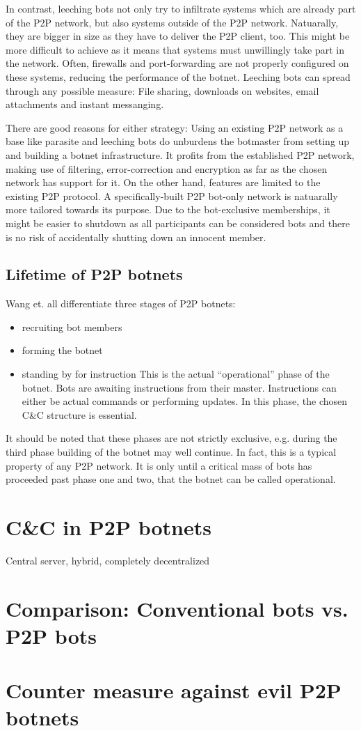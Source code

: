 \documentclass{llncs}
\begin{document}
In contrast, leeching bots not only try to infiltrate systems which
are already part of the P2P network, but also systems outside of the
P2P network. Natuarally, they are bigger in size as they have to
deliver the P2P client, too. This might be more difficult to achieve
as it means that systems must unwillingly take part in the
network. Often, firewalls and port-forwarding are not properly
configured on these systems, reducing the performance of the
botnet. Leeching bots can spread through any possible measure: File
sharing, downloads on websites, email attachments and instant
messanging.

There are good reasons for either strategy: Using an existing P2P
network as a base like parasite and leeching bots do unburdens the
botmaster from setting up and building a botnet infrastructure. It
profits from the established P2P network, making use of filtering,
error-correction and encryption as far as the chosen network has
support for it. On the other hand, features are limited to the
existing P2P protocol. A specifically-built P2P bot-only network is
natuarally more tailored towards its purpose. Due to the bot-exclusive
memberships, it might be easier to shutdown as all participants can be
considered bots and there is no risk of accidentally shutting down an
innocent member.

\subsection{Lifetime of P2P botnets}
Wang et. all\cite{wang2009systematic} differentiate three stages of P2P botnets:
\begin{itemize}
\item recruiting bot members
\item forming the botnet
\item standing by for instruction
This is the actual ``operational'' phase of the botnet. Bots are awaiting instructions from their master. Instructions can either be actual commands or performing updates. In this phase, the chosen C\&C structure is essential.
\end{itemize}
It should be noted that these phases are not strictly exclusive,
e.g. during the third phase building of the botnet may well
continue. In fact, this is a typical property of any P2P network. It
is only until a critical mass of bots has proceeded past phase one and
two, that the botnet can be called operational.

\section{C\&C in P2P botnets}
Central server, hybrid, completely decentralized

\section{Comparison: Conventional bots vs. P2P bots}

\section{Counter measure against evil P2P botnets}



\end{document}
